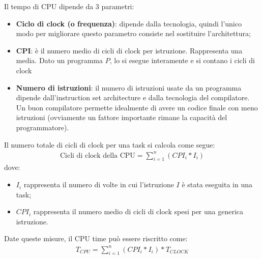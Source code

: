 Il tempo di CPU dipende da 3 parametri:
\begin{itemize}
    \item \textbf{Ciclo di clock (o frequenza)}: dipende dalla tecnologia, quindi l'unico modo per migliorare questo parametro consiste nel sostituire l'architettura;
    \item \textbf{CPI}: è il numero medio di cicli di clock per istruzione. Rappresenta una media. Dato un programma $P$, lo si esegue interamente e si contano i cicli di clock 
    \item \textbf{Numero di istruzioni}: il numero di istruzioni usate da un programma dipende dall'instruction set architecture e dalla tecnologia del compilatore. Un buon compilatore permette idealmente di avere un codice finale con meno istruzioni (ovviamente un fattore importante rimane la capacità del programmatore).
\end{itemize}

Il numero totale di cicli di clock per una task si calcola come segue:
\begin{align*}
    \text{Cicli di clock della CPU} = \sum^n_{i=1} (CPI_i * I_i)
\end{align*}
dove:
\begin{itemize}
    \item $I_i$ rappresenta il numero di volte in cui l'istruzione $I$ è stata eseguita in una task;
    \item $CPI_i$ rappresenta il numero medio di cicli di clock spesi per una generica istruzione.
\end{itemize}

Date queste misure, il CPU time può essere riscritto come:
\begin{align*}
    T_{CPU} = \sum^n_{i = 1} (CPI_i * I_i) * T_{CLOCK}
\end{align*}

